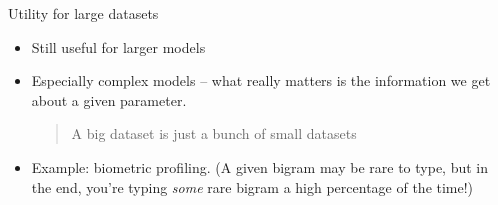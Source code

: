 \documentclass[10pt]{beamer}
\begin{document}
\begin{frame}{Utility for large datasets}


\begin{itemize}
\item Still useful for larger models
\vfill 
\item Especially complex models -- what really matters is the information we get about a given parameter.
\vfill 
\begin{quotation}
A big dataset is just a bunch of small datasets	
\end{quotation}
\vfill 
\item Example: biometric profiling.  {\tiny (A given bigram may be rare to type, but in the end, you're typing \textit{some} rare bigram a high percentage of the time!) }
\end{itemize}

\end{frame}
\end{document}
